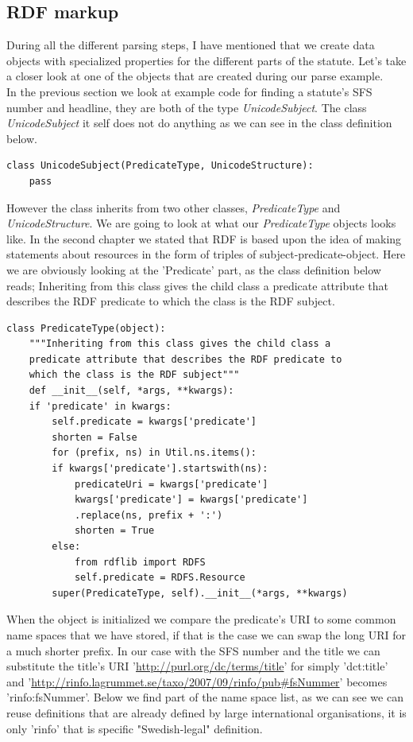 \subsection{RDF markup }
During all the different parsing steps, I have mentioned that we create data objects with specialized properties for the different parts of the statute. Let's take a closer look at one of the objects that are created during our parse example.\\
In the previous section we look at example code for finding a statute's SFS number and headline, they are both of the type \textit{UnicodeSubject}. The class \textit{UnicodeSubject} it self does not do anything as we can see in the class definition below.\\
\begin{verbatim}
class UnicodeSubject(PredicateType, UnicodeStructure):
	pass
\end{verbatim} 
\linebreak
\newline
However the class inherits from two other classes, \textit{PredicateType} and \textit{UnicodeStructure}. We are going to look at what our \textit{PredicateType} objects looks like. In the second chapter we stated that RDF is based upon the idea of making statements about resources in the form of triples of subject-predicate-object. Here we are obviously looking at the 'Predicate' part, as the class definition below reads; Inheriting from this class gives the child class a predicate attribute that describes the RDF predicate to which the class is the RDF subject.\\    
\begin{verbatim}
class PredicateType(object):
    """Inheriting from this class gives the child class a 
    predicate attribute that describes the RDF predicate to 
    which the class is the RDF subject"""
    def __init__(self, *args, **kwargs):
	if 'predicate' in kwargs:
	    self.predicate = kwargs['predicate']
	    shorten = False
	    for (prefix, ns) in Util.ns.items():
		if kwargs['predicate'].startswith(ns):
		    predicateUri = kwargs['predicate']
		    kwargs['predicate'] = kwargs['predicate']
			.replace(ns, prefix + ':')	
		    shorten = True
		else:
		    from rdflib import RDFS
		    self.predicate = RDFS.Resource
	    super(PredicateType, self).__init__(*args, **kwargs)
\end{verbatim} 
\linebreak
\newline
When the object is initialized we compare the predicate's URI to some common name spaces that we have stored, if that is the case we can swap the long URI for a much shorter prefix. In our case with the SFS number and the title we can substitute the title's URI '\url{http://purl.org/dc/terms/title}' for simply 'dct:title' and '\url{http://rinfo.lagrummet.se/taxo/2007/09/rinfo/pub#fsNummer}' becomes 'rinfo:fsNummer'. Below we find part of the name space list, as we can see we can reuse definitions that are already defined by large international organisations, it is only 'rinfo' that is specific "Swedish-legal" definition.     
